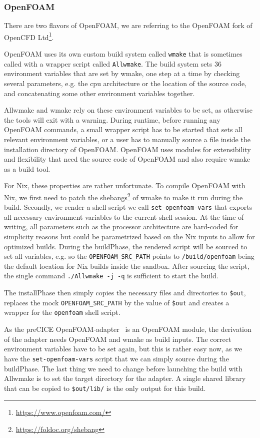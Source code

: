 \documentclass{eceasst}
\begin{document}
\subsubsection{OpenFOAM}

There are two flavors of OpenFOAM, we are referring to the OpenFOAM fork of OpenCFD Ltd\footnote{\url{https://www.openfoam.com/}}.

OpenFOAM uses its own custom build system called \texttt{wmake} that is sometimes called with a wrapper script called \texttt{Allwmake}.
The build system sets 36 environment variables that are set by wmake, one step at a time by checking several parameters, e.g. the cpu architecture or the location of the source code, and concatenating some other environment variables together.

Allwmake and wmake rely on these environment variables to be set, as otherwise the tools will exit with a warning.
During runtime, before running any OpenFOAM commands, a small wrapper script has to be started that sets all relevant environment variables, or a user has to manually source a file inside the installation directory of OpenFOAM.
OpenFOAM uses modules for extensibility and flexibility that need the source code of OpenFOAM and also require wmake as a build tool.

For Nix, these properties are rather unfortunate.
To compile OpenFOAM with Nix, we first need to patch the shebangs\footnote{\url{https://foldoc.org/shebang}} of wmake to make it run during the build.
Secondly, we render a shell script we call \texttt{set-openfoam-vars} that exports all necessary environment variables to the current shell session.
At the time of writing, all parameters such as the processor architecture are hard-coded for simplicity reasons but could be parametrized based on the Nix inputs to allow for optimized builds.
During the buildPhase, the rendered script will be sourced to set all variables, e.g. so the \texttt{OPENFOAM\_SRC\_PATH} points to \texttt{/build/openfoam} being the default location for Nix builds inside the sandbox.
After sourcing the script, the single command \texttt{./Allwmake -j -q} is sufficient to start the build.

The installPhase then simply copies the necessary files and directories to \texttt{\$out}, replaces the mock \texttt{OPENFOAM\_SRC\_PATH} by the value of \texttt{\$out} and creates a wrapper for the \texttt{openfoam} shell script.

As the preCICE OpenFOAM-adapter~\cite{OpenFOAMpreCICE} is an OpenFOAM module, the derivation of the adapter needs OpenFOAM and wmake as build inputs.
The correct environment variables have to be set again, but this is rather easy now, as we have the \texttt{set-openfoam-vars} script that we can simply source during the buildPhase.
The last thing we need to change before launching the build with Allwmake is to set the target directory for the adapter.
A single shared library that can be copied to \texttt{\$out/lib/} is the only output for this build.
\end{document}
